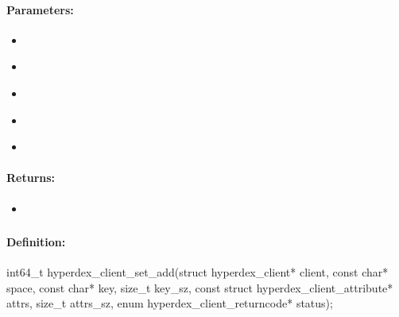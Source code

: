 \paragraph{Parameters:}
\begin{itemize}[noitemsep]
\item {}\\

\item {}\\

\item {}\\

\item {}\\

\item {}\\

\end{itemize}

\paragraph{Returns:}
\begin{itemize}[noitemsep]
\item {}\\

\end{itemize}

\pagebreak
\subsubsection{}
\label{api:c:set_add}


\paragraph{Definition:}
\begin{ccode}
int64_t hyperdex_client_set_add(struct hyperdex_client* client,
        const char* space,
        const char* key, size_t key_sz,
        const struct hyperdex_client_attribute* attrs, size_t attrs_sz,
        enum hyperdex_client_returncode* status);
\end{ccode}

